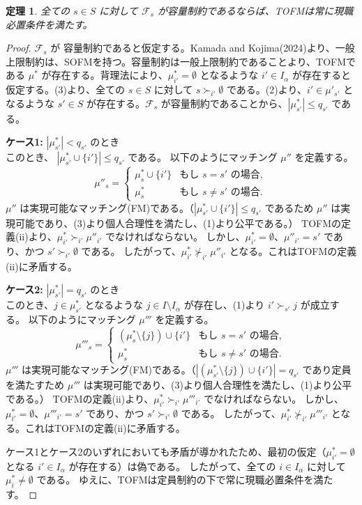 \documentclass[12pt, a4paper]{article}
\theoremstyle{definition}
\theoremstyle{remark}
\theoremstyle{plain}
\newtheorem{theorem}{定理}
\begin{document}
  
\begin{theorem}
  全ての $s \in S$ に対して $\mathcal{F}_s$ が容量制約であるならば、TOFMは常に現職必置条件を満たす。
\end{theorem}

\begin{proof}
  $\mathcal{F}_s$ が 容量制約であると仮定する。Kamada and Kojima(2024)より、一般上限制約は、SOFMを持つ。容量制約は一般上限制約であることより、TOFMである $\mu^*$ が存在する。背理法により、$\mu^*_{i'} = \emptyset$ となるような $i' \in I_\alpha$ が存在すると仮定する。(3)より、全ての $s \in S$ に対して $s \succ_{i'} \emptyset$ である。(2)より、$i' \in \mu'_{s'}$ となるような $s' \in S$ が存在する。$\mathcal{F}_s$ が容量制約であることから、$|\mu^*_{s'}| \leq q_{s'}$ である。

  \textbf{ケース1:} $|\mu^*_{s'}| < q_{s'}$ のとき\\
  このとき、 $|\mu^*_{s'} \cup \{i'\}| \leq q_{s'}$ である。
  以下のようにマッチング $\mu''$ を定義する。
  \[
      \mu''_{s} =
      \begin{cases}
      \mu^*_{s} \cup \{i'\} & \text{もし } s = s' \text{ の場合}, \\
      \mu^*_{s} & \text{もし } s \neq s' \text{ の場合}.
      \end{cases}
  \]
  $\mu''$ は実現可能なマッチング(FM)である。（$|\mu^*_{s'} \cup \{i'\}| \leq q_{s'}$ であるため $\mu''$ は実現可能であり、(3)より個人合理性を満たし、(1)より公平である。）
  TOFMの定義(ii)より、$\mu^*_{i'} \succ_{i'} \mu''_{i'}$ でなければならない。
  しかし、$\mu^*_{i'} = \emptyset$、$\mu''_{i'} = s'$ であり、かつ $s' \succ_{i'} \emptyset$ である。
  したがって、$\mu^*_{i'} \nsucc_{i'} \mu''_{i'}$ となる。これはTOFMの定義(ii)に矛盾する。

  \textbf{ケース2:} $|\mu^*_{s'}| = q_{s'}$ のとき\\
このとき、$j \in \mu^*_{s'}$ となるような $j \in I \setminus I_\alpha$ が存在し、(1)より $i' \succ_{s'} j$ が成立する。
以下のようにマッチング $\mu'''$ を定義する。
\[
    \mu'''_{s} =
    \begin{cases}
    (\mu^*_{s} \setminus \{j\}) \cup \{i'\} & \text{もし } s = s' \text{ の場合}, \\
    \mu^*_{s} & \text{もし } s \neq s' \text{ の場合}.
    \end{cases}
\]
$\mu'''$ は実現可能なマッチング(FM)である。（$|(\mu^*_{s'}\setminus \{j\}) \cup \{i'\}| = q_{s'}$ であり定員を満たすため $\mu'''$ は実現可能であり、(3)より個人合理性を満たし、(1)より公平である。）
TOFMの定義(ii)より、$\mu^*_{i'} \succ_{i'} \mu'''_{i'}$ でなければならない。
しかし、$\mu^*_{i'} = \emptyset$、$\mu'''_{i'} = s'$ であり、かつ $s' \succ_{i'} \emptyset$ である。
したがって、$\mu^*_{i'} \nsucc_{i'} \mu'''_{i'}$ となる。これはTOFMの定義(ii)に矛盾する。

ケース1とケース2のいずれにおいても矛盾が導かれたため、最初の仮定（$\mu^*_{i'} = \emptyset$ となる $i' \in I_\alpha$ が存在する）は偽である。
したがって、全ての $i \in I_\alpha$ に対して $\mu^*_i \neq \emptyset$ である。
ゆえに、TOFMは定員制約の下で常に現職必置条件を満たす。
\end{proof}
\end{document}
